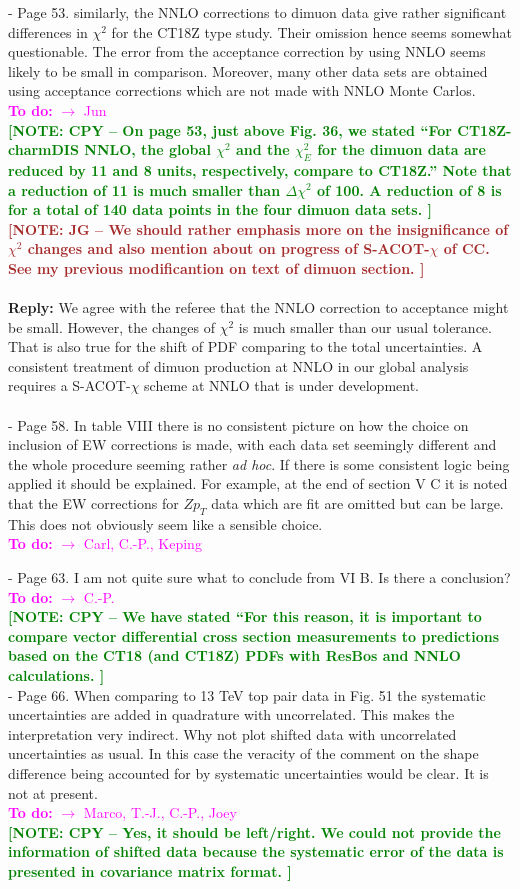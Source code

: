 \documentclass[aps,prd,amsmath,nofootinbib,floatfix,fleqn]{revtex4}
\newcommand{\TODO}[1]{\textcolor{magenta}{
\quad\vspace{3pt} \\ {\bf To do:} #1 \\
}}
\newcommand{\REPLY}[1]{\textcolor{redish}{\quad \\
{\bf Reply:} #1 \\
}}
\newcommand{\NOTECPY}[1]{\textcolor{green}{ \bf[NOTE: CPY -- #1 ]}}
\newcommand{\NOTEJG}[1]{\textcolor{brown}{ \bf[NOTE: JG -- #1 ]}}
\begin{document}
- Page 53. similarly, the NNLO corrections to dimuon data give rather
significant differences in $\chi^2$ for the CT18Z type study. Their omission
hence seems somewhat questionable. The error from the acceptance correction by
using NNLO seems likely to be small in comparison. Moreover, many other data
sets are obtained using acceptance corrections which are not made with NNLO
Monte Carlos.
\TODO{$\to$ Jun}
\NOTECPY{On page 53, just above Fig. 36, we stated ``For CT18Z-charmDIS NNLO, the global $\chi^2$ and the $\chi_E^2$ for the dimuon data are reduced by 11 and 8 units, respectively, compare to CT18Z.'' Note that a reduction of 11 is much smaller than $\Delta \chi^2$ of 100. A reduction of 8 is for a total of 140 data points in the four dimuon data sets.}\\
\NOTEJG{We should rather emphasis more on the insignificance of $\chi^2$ changes and also mention about on progress of S-ACOT-$\chi$ of CC. See my previous modificantion on text of dimuon section.}\\
\REPLY{We agree with the referee that the NNLO correction to acceptance might be small. However, the changes of $\chi^2$ is much
smaller than our usual tolerance. That is also true for the shift of PDF comparing to the total uncertainties. A consistent treatment
of dimuon production at NNLO in our global analysis requires a S-ACOT-$\chi$ scheme at NNLO that is under development.}\\

- Page 58. In table VIII there is no consistent picture on how the choice on
inclusion of EW corrections is made, with each data set seemingly different and
the whole procedure seeming rather {\it ad hoc}. If there is some consistent
logic being applied it should be explained.  For example, at the end of section
V C it is noted that the EW corrections for $Z p_T$ data which are fit are
omitted but can be large. This does not obviously seem like a sensible choice.
\TODO{$\to$ Carl, C.-P., Keping}

- Page 63. I am not quite sure what to conclude from VI B. Is there a
conclusion?
\TODO{$\to$ C.-P.}
\NOTECPY{We have stated ``For this reason, it is important to compare vector differential cross section measurements to predictions based on  the CT18 (and CT18Z) PDFs with ResBos and NNLO calculations.}\\

- Page 66. When comparing to 13 TeV top pair data in Fig. 51 the systematic
uncertainties are added in quadrature with uncorrelated. This makes the
interpretation very indirect. Why not plot shifted data with uncorrelated
uncertainties as usual. In this case the veracity of the comment on the shape
difference being accounted for by systematic uncertainties would be clear. It is not at present.
\TODO{$\to$ Marco, T.-J., C.-P., Joey}
\NOTECPY{Yes, it should be left/right. We could not provide the information of shifted data because the systematic error of the data is presented in covariance matrix format. }\\
\end{document}
